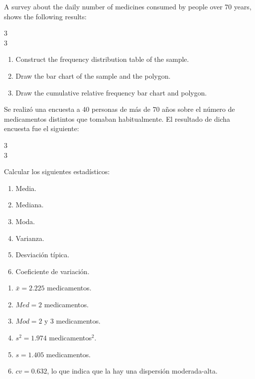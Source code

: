 
{A survey about the daily number of medicines consumed by people over 70 years, shows the following results:

\begin{center}
3 \\
3
\end{center}

\begin{enumerate}
\item Construct the frequency distribution table of the sample.
\item Draw the bar chart of the sample and the polygon.
\item Draw the cumulative relative frequency bar chart and polygon.
\end{enumerate}
}
{
}
{}

{Se realizó una encuesta a 40 personas de más de 70 años sobre el número de medicamentos distintos que tomaban habitualmente. El resultado de dicha encuesta fue el siguiente:
\begin{center}
3 \\
3
\end{center}
Calcular los siguientes estadísticos:
\begin{enumerate}
\item Media.
\item Mediana.
\item Moda.
\item Varianza.
\item Desviación típica.
\item Coeficiente de variación.
\end{enumerate}
}
{\begin{enumerate}
\item $ \bar{x} = 2.225$ medicamentos.
\item $Med =2$ medicamentos.
\item $Mod= 2$ y $3$ medicamentos.
\item $s^2 = 1.974$ medicamentos$^2$.
\item $s= 1.405$ medicamentos.
\item $cv = 0.632$, lo que indica que la hay una dispersión moderada-alta.
\end{enumerate}
}
{}


